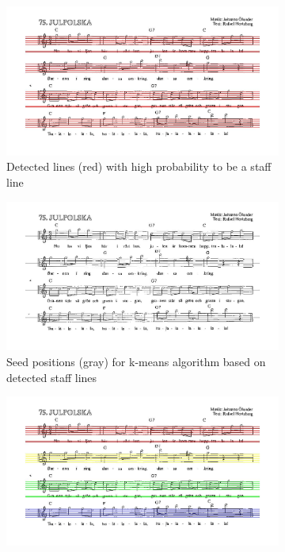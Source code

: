 \begin{figure}[htbp]
\begin{subfigure}[b]{0.48\textwidth}
        \includegraphics[width=\textwidth]{staff_textLines_staffLines.jpg}
        \caption{Detected lines (red) with high probability to be a staff line}
  \end{subfigure}
  \begin{subfigure}[b]{0.48\textwidth}
        \includegraphics[width=\textwidth]{staff_textLines_seeds.jpg}
        \caption{Seed positions (gray) for k-means algorithm based on detected staff lines}
  \end{subfigure}
  \begin{subfigure}[b]{0.48\textwidth}
        \includegraphics[width=\textwidth]{staff_textLines_cluster1.jpg}

\end{subfigure}
\end{figure}
